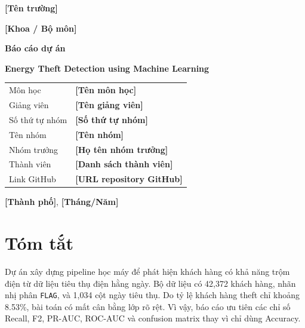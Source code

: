 \documentclass[12pt,a4paper]{article}
\newcommand{\placeholder}[1]{\textbf{[#1]}}
\begin{document}
\begin{titlepage}
    \centering
    \vspace*{1cm}
    {\Large \placeholder{Tên trường}\par}
    \vspace{0.4cm}
    {\large \placeholder{Khoa / Bộ môn}\par}
    \vspace{1.5cm}
    {\Huge\bfseries Báo cáo dự án\par}
    \vspace{0.4cm}
    {\LARGE\bfseries Energy Theft Detection using Machine Learning\par}
    \vspace{1.5cm}

    \begin{tcolorbox}[colback=boxblue,colframe=boxborder,width=0.88\textwidth,arc=2mm]
        \begin{tabular}{@{}p{}p{}@{}}
            Môn học & \placeholder{Tên môn học} \\
            Giảng viên & \placeholder{Tên giảng viên} \\
            Số thứ tự nhóm & \placeholder{Số thứ tự nhóm} \\
            Tên nhóm & \placeholder{Tên nhóm} \\
            Nhóm trưởng & \placeholder{Họ tên nhóm trưởng} \\
            Thành viên & \placeholder{Danh sách thành viên} \\
            Link GitHub & \placeholder{URL repository GitHub} \\
        \end{tabular}
    \end{tcolorbox}

    \vfill
    {\large \placeholder{Thành phố}, \placeholder{Tháng/Năm}\par}
\end{titlepage}

\tableofcontents
\newpage

\section{Tóm tắt}

Dự án xây dựng pipeline học máy để phát hiện khách hàng có khả năng trộm điện từ dữ liệu tiêu thụ điện hằng ngày. Bộ dữ liệu có 42,372 khách hàng, nhãn nhị phân \texttt{FLAG}, và 1,034 cột ngày tiêu thụ. Do tỷ lệ khách hàng theft chỉ khoảng 8.53\%, bài toán có mất cân bằng lớp rõ rệt. Vì vậy, báo cáo ưu tiên các chỉ số Recall, F2, PR-AUC, ROC-AUC và confusion matrix thay vì chỉ dùng Accuracy.
\end{document}

